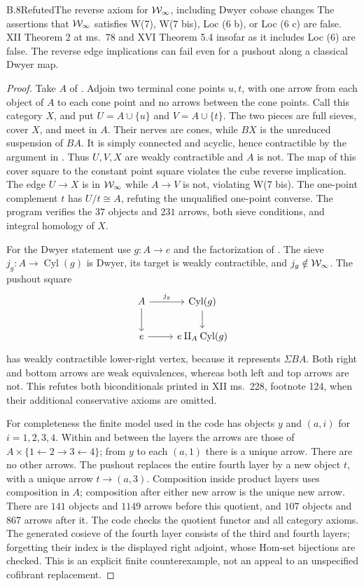 \begin{claim}{B.8}{Refuted}{The reverse axiom for $\mathcal{W}_{\infty}$, including Dwyer cobase changes}
The assertions that $\mathcal{W}_{\infty}$ satisfies W(7), W(7 bis), Loc (6 b), or Loc (6 c) are false. XII Theorem 2 at ms.~78 and XVI Theorem 5.4 insofar as it includes Loc (6) are false. The reverse edge implications can fail even for a pushout along a classical Dwyer map.
\end{claim}
\begin{proof}
Take $A$ of . Adjoin two terminal cone points $u,t$, with one arrow from each object of $A$ to each cone point and no arrows between the cone points. Call this category $X$, and put $U=A\cup\{u\}$ and $V=A\cup\{t\}$. The two pieces are full sieves, cover $X$, and meet in $A$. Their nerves are cones, while $BX$ is the unreduced suspension of $BA$. It is simply connected and acyclic, hence contractible by the argument in . Thus $U,V,X$ are weakly contractible and $A$ is not. The map of this cover square to the constant point square violates the cube reverse implication. The edge $U\to X$ is in $\mathcal{W}_{\infty}$ while $A\to V$ is not, violating W(7 bis). The one-point complement $t$ has $U/t\cong A$, refuting the unqualified one-point converse. The program verifies the $37$ objects and $231$ arrows, both sieve conditions, and integral homology of $X$.

For the Dwyer statement use $g:A\to e$ and the factorization of . The sieve $j_g:A\to\operatorname{Cyl}(g)$ is Dwyer, its target is weakly contractible, and $j_g\notin\mathcal{W}_{\infty}$. The pushout square
\[
 \begin{tikzcd}
 A\arrow[r,"j_g"]\arrow[d]&\operatorname{Cyl}(g)\arrow[d]\\
 e\arrow[r]&e\amalg_A\operatorname{Cyl}(g)
 \end{tikzcd}
\]
has weakly contractible lower-right vertex, because it represents $\Sigma BA$. Both right and bottom arrows are weak equivalences, whereas both left and top arrows are not. This refutes both biconditionals printed in XII ms.~228, footnote 124, when their additional conservative axioms are omitted.

For completeness the finite model used in the code has objects $y$ and $(a,i)$ for $i=1,2,3,4$. Within and between the layers the arrows are those of $A\times\{1\leftarrow2\to3\leftarrow4\}$; from $y$ to each $(a,1)$ there is a unique arrow. There are no other arrows. The pushout replaces the entire fourth layer by a new object $t$, with a unique arrow $t\to(a,3)$. Composition inside product layers uses composition in $A$; composition after either new arrow is the unique new arrow. There are $141$ objects and $1149$ arrows before this quotient, and $107$ objects and $867$ arrows after it. The code checks the quotient functor and all category axioms. The generated cosieve of the fourth layer consists of the third and fourth layers; forgetting their index is the displayed right adjoint, whose Hom-set bijections are checked. This is an explicit finite counterexample, not an appeal to an unspecified cofibrant replacement.
\end{proof}

